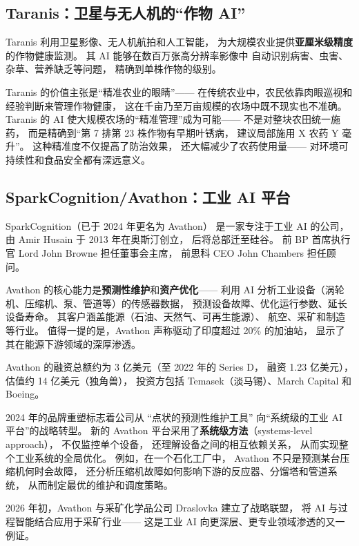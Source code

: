 \subsection{Taranis：卫星与无人机的``作物 AI''}

Taranis 利用卫星影像、无人机航拍和人工智能，
为大规模农业提供\textbf{亚厘米级精度}的作物健康监测。
其 AI 能够在数百万张高分辨率影像中
自动识别病害、虫害、杂草、营养缺乏等问题，
精确到单株作物的级别。

Taranis 的价值主张是``精准农业的眼睛''——
在传统农业中，农民依靠肉眼巡视和经验判断来管理作物健康，
这在千亩乃至万亩规模的农场中既不现实也不准确。
Taranis 的 AI 使大规模农场的``精准管理''成为可能——
不是对整块农田统一施药，
而是精确到``第 7 排第 23 株作物有早期叶锈病，
建议局部施用 X 农药 Y 毫升''。
这种精准度不仅提高了防治效果，
还大幅减少了农药使用量——
对环境可持续性和食品安全都有深远意义。

\subsection{SparkCognition/Avathon：工业 AI 平台}

SparkCognition（已于 2024 年更名为 Avathon）
是一家专注于工业 AI 的公司，
由 Amir Husain 于 2013 年在奥斯汀创立，
后将总部迁至硅谷。
前 BP 首席执行官 Lord John Browne 担任董事会主席，
前思科 CEO John Chambers 担任顾问。

Avathon 的核心能力是\textbf{预测性维护}和\textbf{资产优化}——
利用 AI 分析工业设备（涡轮机、压缩机、泵、管道等）的传感器数据，
预测设备故障、优化运行参数、延长设备寿命。
其客户涵盖能源（石油、天然气、可再生能源）、
航空、采矿和制造等行业。
值得一提的是，Avathon 声称驱动了印度超过 20\% 的加油站，
显示了其在能源下游领域的深厚渗透。

Avathon 的融资总额约为 3 亿美元（至 2022 年的 Series D，
融资 1.23 亿美元），
估值约 14 亿美元（独角兽），
投资方包括 Temasek（淡马锡）、March Capital 和 Boeing。

2024 年的品牌重塑标志着公司从
``点状的预测性维护工具''
向``系统级的工业 AI 平台''的战略转型。
新的 Avathon 平台采用了\textbf{系统级方法}（systems-level approach），
不仅监控单个设备，
还理解设备之间的相互依赖关系，
从而实现整个工业系统的全局优化。
例如，在一个石化工厂中，
Avathon 不只是预测某台压缩机何时会故障，
还分析压缩机故障如何影响下游的反应器、分馏塔和管道系统，
从而制定最优的维护和调度策略。

2026 年初，Avathon 与采矿化学品公司 Draslovka 建立了战略联盟，
将 AI 与过程智能结合应用于采矿行业——
这是工业 AI 向更深层、更专业领域渗透的又一例证。

